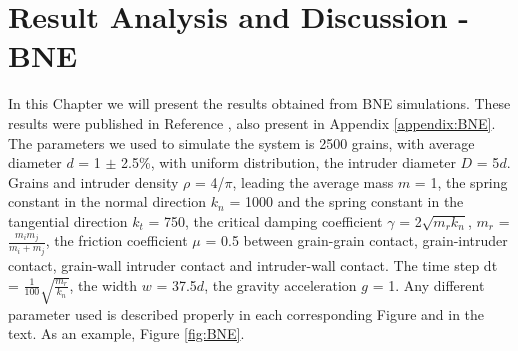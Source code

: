 
\chapter{Result Analysis and Discussion - BNE}
\label{chap:Resultados-BNE}





    In this Chapter we will present the results obtained from BNE simulations. These results were published in Reference \cite{Large-deviation_quantification_of_boundary_conditions_on_the_Brazil_nut_effect}, also present in Appendix \ref{appendix:BNE}. The parameters we used to simulate the system is 2500 grains, with average diameter $d$ = 1 $\pm$ 2.5\%, with uniform distribution, the intruder diameter $D$ = 5$d$. Grains and intruder density $\rho$ = 4/$\pi$, leading the average mass $m$ = 1, the spring constant in the normal direction $k_{n}$ = 1000 and the spring constant in the tangential direction $k_{t}$ = 750, the critical damping coefficient $\gamma$ = 2$\sqrt{m_r k_{n}}$, $m_r$ = $\frac{m_i m_j}{m_i + m_j}$, the friction coefficient $\mu$ = 0.5 between grain-grain contact, grain-intruder contact, grain-wall intruder contact and intruder-wall contact. The time step dt = $\frac{1}{100}\sqrt{\frac{m_r}{k_n}}$, the width $w$ = 37.5$d$, the gravity acceleration $g$ = 1. Any different parameter used is described properly in each corresponding Figure and in the text. As an example, Figure \ref{fig:BNE}.

